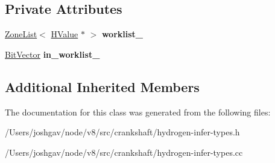 \subsection*{Private Attributes}
\begin{DoxyCompactItemize}
\item 
\hyperlink{classv8_1_1internal_1_1_zone_list}{Zone\+List}$<$ \hyperlink{classv8_1_1internal_1_1_h_value}{H\+Value} $\ast$ $>$ {\bfseries worklist\+\_\+}\hypertarget{classv8_1_1internal_1_1_h_infer_types_phase_af67ea64f85be9e231a43bf10b172313a}{}\label{classv8_1_1internal_1_1_h_infer_types_phase_af67ea64f85be9e231a43bf10b172313a}

\item 
\hyperlink{classv8_1_1internal_1_1_bit_vector}{Bit\+Vector} {\bfseries in\+\_\+worklist\+\_\+}\hypertarget{classv8_1_1internal_1_1_h_infer_types_phase_a1ba44e71473337efb170991544b01d6f}{}\label{classv8_1_1internal_1_1_h_infer_types_phase_a1ba44e71473337efb170991544b01d6f}

\end{DoxyCompactItemize}
\subsection*{Additional Inherited Members}


The documentation for this class was generated from the following files\+:\begin{DoxyCompactItemize}
\item 
/\+Users/joshgav/node/v8/src/crankshaft/hydrogen-\/infer-\/types.\+h\item 
/\+Users/joshgav/node/v8/src/crankshaft/hydrogen-\/infer-\/types.\+cc\end{DoxyCompactItemize}
